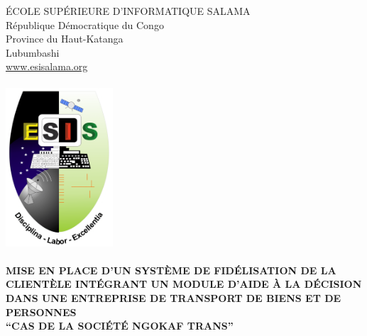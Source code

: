 
\begin{titlepage} %
	\center %
	
	
	{\large ÉCOLE SUPÉRIEURE D’INFORMATIQUE SALAMA}\\ %
	
	{\large République Démocratique du Congo}\\ %
	
	{\large Province du Haut-Katanga}\\ %
	
	{\large Lubumbashi}\\ %
	
	{\large \href{www.esisalama.org}{www.esisalama.org}}\\[0.25cm] %

	\HHRule\\[1cm]

    \includegraphics[width=40mm]{images/logoesis.png}\\[0.5cm]

	
	\HRule\\[0.4cm]
	
	\textbf{MISE EN PLACE D’UN SYSTÈME DE FIDÉLISATION DE LA CLIENTÈLE
	INTÉGRANT UN MODULE D’AIDE À LA DÉCISION DANS UNE ENTREPRISE DE TRANSPORT
	DE BIENS ET DE PERSONNES\\\enquote{CAS DE LA SOCIÉTÉ NGOKAF TRANS}}
	

\end{titlepage}
